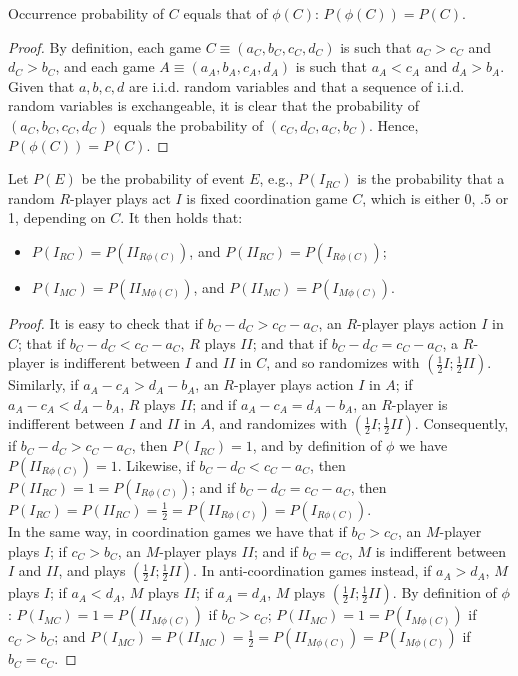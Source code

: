 \documentclass[fleqn,reqno,11pt]{article}
\begin{document}
\begin{lemma} \label{lemma:probabilities coord-ant}
Occurrence probability of $C$ equals that of $\phi(C)$: $P(\phi(C))=P(C)$.
\end{lemma}

\begin{proof}
  By definition, each game $C\equiv(a_{C},b_{C},c_{C},d_{C})$ is such that $a_{C}>c_{C}$ and
  $d_{C}>b_{C}$, and each game $A\equiv(a_{A},b_{A},c_{A},d_{A})$ is such that $a_{A}<c_{A}$
  and $d_{A}>b_{A}$. Given that $a,b,c,d$ are i.i.d. random variables and that a sequence of
  i.i.d. random variables is exchangeable, it is clear that the probability of
  $(a_{C},b_{C},c_{C},d_{C})$ equals the probability of $(c_{C},d_{C},a_{C},b_{C})$.  Hence,
  $P(\phi(C))=P(C)$.
\end{proof}

\begin{lemma} \label{lemma:probabilities actions coord-ant} Let $P(E)$ be the probability of
  event $E$, e.g., $P(I_{RC})$ is the probability that a random $R$-player plays act $I$ is
  fixed coordination game $C$, which is either 0, $.5$ or 1, depending on $C$.  It then holds
  that:
\begin{itemize}
\item $P(I_{RC})=P(II_{R\phi(C)})$, and $P(II_{RC})=P(I_{R\phi(C)})$;
\item $P(I_{MC})=P(II_{M\phi(C)})$, and $P(II_{MC})=P(I_{M\phi(C)})$.
\end{itemize}
\end{lemma}

\begin{proof}
  It is easy to check that if $b_{C}-d_{C}>c_{C}-a_{C}$, an $R$-player plays action $I$ in $C$;
  that if $b_{C}-d_{C}<c_{C}-a_{C}$, $R$ plays $II$; and that if $b_{C}-d_{C}=c_{C}-a_{C}$, a
  $R$-player is indifferent between $I$ and $II$ in $C$, and so randomizes with
  $(\frac{1}{2}I;\frac{1}{2}II)$. Similarly, if $a_{A}-c_{A}>d_{A}-b_{A}$, an $R$-player plays
  action $I$ in $A$; if $a_{A}-c_{A}<d_{A}-b_{A}$, $R$ plays $II$; and if
  $a_{A}-c_{A}=d_{A}-b_{A}$, an $R$-player is indifferent between $I$ and $II$ in $A$, and
  randomizes with $(\frac{1}{2}I;\frac{1}{2}II)$. Consequently, if $b_{C}-d_{C}>c_{C}-a_{C}$,
  then $P(I_{RC})=1$, and by definition of $\phi$ we have $P(II_{R\phi(C)})=1$. Likewise, if
  $b_{C}-d_{C}<c_{C}-a_{C}$, then $P(II_{RC})=1=P(I_{R\phi(C)})$; and if
  $b_{C}-d_{C}=c_{C}-a_{C}$,
  then $P(I_{RC})=P(II_{RC})=\frac{1}{2}=P(II_{R\phi(C)})=P(I_{R\phi(C)})$. \\
  In the same way, in coordination games we have that if $b_{C}>c_{C}$, an $M$-player plays $I$;
  if $c_{C}>b_{C}$, an $M$-player plays $II$; and if $b_{C}=c_{C}$, $M$ is indifferent between
  $I$ and $II$, and plays $(\frac{1}{2}I;\frac{1}{2}II)$. In anti-coordination games instead,
  if $a_{A}>d_{A}$, $M$ plays $I$; if $a_{A}<d_{A}$, $M$ plays $II$; if $a_{A}=d_{A}$, $M$
  plays $(\frac{1}{2}I;\frac{1}{2}II)$.  By definition of $\phi$:
  $P(I_{MC})=1=P(II_{M\phi(C)})$ if $b_{C}>c_{C}$; $P(II_{MC})=1=P(I_{M\phi(C)})$ if
  $c_{C}>b_{C}$; and $P(I_{MC})=P(II_{MC})=\frac{1}{2}=P(II_{M\phi(C)})=P(I_{M\phi(C)})$ if
  $b_{C}=c_{C}$.
\end{proof}
\end{document}
